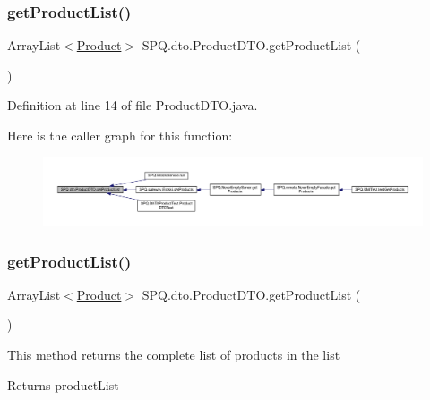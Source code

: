 \subsubsection{\texorpdfstring{get\+Product\+List()}{getProductList()}\hspace{0.1cm}{\footnotesize\ttfamily [1/2]}}
{\footnotesize\ttfamily Array\+List$<$\mbox{\hyperlink{class_s_p_q_1_1data_1_1_product}{Product}}$>$ S\+P\+Q.\+dto.\+Product\+D\+T\+O.\+get\+Product\+List (\begin{DoxyParamCaption}{ }\end{DoxyParamCaption})}



Definition at line 14 of file Product\+D\+T\+O.\+java.

Here is the caller graph for this function\+:\nopagebreak
\begin{figure}[H]
\begin{center}
\leavevmode
\includegraphics[width=350pt]{class_s_p_q_1_1dto_1_1_product_d_t_o_a4b7df5983f4342285d495a335fb9019f_icgraph}
\end{center}
\end{figure}
\mbox{\label{class_s_p_q_1_1dto_1_1_product_d_t_o_a4b7df5983f4342285d495a335fb9019f}} 
\subsubsection{\texorpdfstring{get\+Product\+List()}{getProductList()}\hspace{0.1cm}{\footnotesize\ttfamily [2/2]}}
{\footnotesize\ttfamily Array\+List$<$\mbox{\hyperlink{class_s_p_q_1_1data_1_1_product}{Product}}$>$ S\+P\+Q.\+dto.\+Product\+D\+T\+O.\+get\+Product\+List (\begin{DoxyParamCaption}{ }\end{DoxyParamCaption})}

This method returns the complete list of products in the list \begin{DoxyReturn}{Returns}
product\+List 
\end{DoxyReturn}



